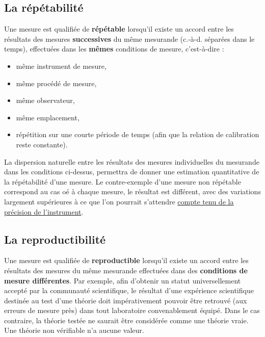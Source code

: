 \subsection{La répétabilité}

Une mesure est qualifiée de \textbf{répétable} lorsqu'il existe un accord entre les résultats des mesures \textbf{successives} du même mesurande (c.-à-d. séparées dans le temps), effectuées dans les \textbf{mêmes} conditions de mesure, c'est-à-dire :
\begin{itemize}
\item même instrument de mesure,
\item même procédé de mesure,
\item même observateur,
\item même emplacement,
\item répétition sur une courte période de temps (afin que la relation de calibration reste constante).
\end{itemize}
La dispersion naturelle entre les résultats des mesures individuelles du mesurande dans les conditions ci-dessus, permettra de donner une estimation quantitative de la répétabilité d'une mesure. Le contre-exemple d'une mesure non répétable correspond au cas oé à chaque mesure, le résultat est différent, avec des variations largement supérieures à ce que l'on pourrait s'attendre \underline{compte tenu de la précision de l'instrument}.

\subsection{La reproductibilité}

Une mesure est qualifiée de \textbf{reproductible} lorsqu'il existe un accord entre les résultats des mesures du même mesurande effectuées dans des \textbf{conditions de mesure différentes}. Par exemple, afin d'obtenir un statut universellement accepté par la communauté scientifique, le résultat d'une expérience scientifique destinée au test d'une théorie doit impérativement pouvoir être retrouvé (aux erreurs de mesure près) dans tout laboratoire convenablement équipé. Dans le cas contraire, la théorie testée ne saurait être considérée comme une théorie vraie. Une théorie non vérifiable n'a aucune valeur.

